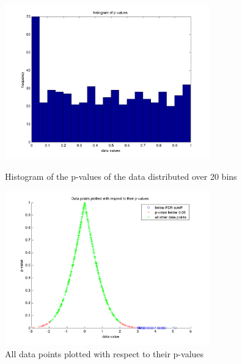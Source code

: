\documentclass{acm_proc_article-sp}
\begin{document}
\begin{figure}[t]
\centering
   \includegraphics[width=3.5in]{hist-p.png}
\caption{Histogram of the p-values of the data distributed over 20 bins}

   \includegraphics[width=3.5in]{all-data.png}
\caption{All data points plotted with respect to their p-values}
\end{figure}

  
%


%
%

\balancecolumns
\end{document}
